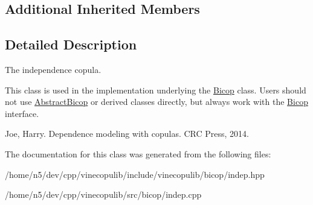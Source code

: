 \subsection*{Additional Inherited Members}


\subsection{Detailed Description}
The independence copula. 

This class is used in the implementation underlying the \hyperlink{classvinecopulib_1_1_bicop}{Bicop} class. Users should not use \hyperlink{classvinecopulib_1_1_abstract_bicop}{Abstract\+Bicop} or derived classes directly, but always work with the \hyperlink{classvinecopulib_1_1_bicop}{Bicop} interface.

Joe, Harry. Dependence modeling with copulas. C\+RC Press, 2014. 

The documentation for this class was generated from the following files\+:\begin{DoxyCompactItemize}
\item 
/home/n5/dev/cpp/vinecopulib/include/vinecopulib/bicop/indep.\+hpp\item 
/home/n5/dev/cpp/vinecopulib/src/bicop/indep.\+cpp\end{DoxyCompactItemize}
